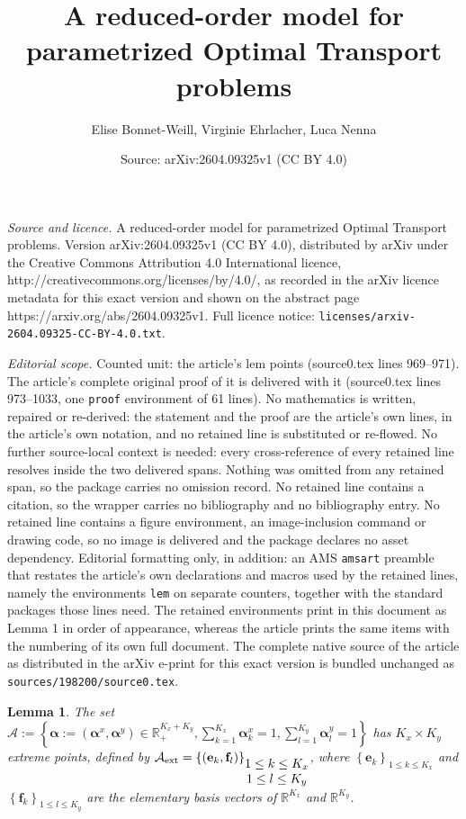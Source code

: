 \documentclass[10pt,a4paper]{amsart}
\title{A reduced-order model for parametrized Optimal Transport problems}
\author{Elise Bonnet-Weill, Virginie Ehrlacher, Luca Nenna}
\date{Source: arXiv:2604.09325v1 (CC BY 4.0)}
\newtheorem{lem}{Lemma}
\def\RR{\mathbb{R}}
\def\aalpha{\boldsymbol{\alpha}}
\def\cA{\mathcal{A}}
\def\ee{\mathbf{e}}
\def\ff{\mathbf{f}}
\begin{document}
\maketitle

\noindent\emph{Source and licence.} A reduced-order model for parametrized Optimal Transport problems. Version arXiv:2604.09325v1 (CC BY 4.0), distributed by arXiv under the Creative Commons Attribution 4.0 International licence, http://creativecommons.org/licenses/by/4.0/, as recorded in the arXiv licence metadata for this exact version and shown on the abstract page https://arxiv.org/abs/2604.09325v1. Full licence notice: \texttt{licenses/arxiv-2604.09325-CC-BY-4.0.txt}.\par\smallskip

\noindent\textit{Editorial scope.} Counted unit: the article's lem points (source0.tex lines 969--971). The article's complete original proof of it is delivered with it (source0.tex lines 973--1033, one \texttt{proof} environment of 61 lines). No mathematics is written, repaired or re-derived: the statement and the proof are the article's own lines, in the article's own notation, and no retained line is substituted or re-flowed.  No further source-local context is needed: every cross-reference of every retained line resolves inside the two delivered spans.  Nothing was omitted from any retained span, so the package carries no omission record.  No retained line contains a citation, so the wrapper carries no bibliography and no bibliography entry.  No retained line contains a figure environment, an image-inclusion command or drawing code, so no image is delivered and the package declares no asset dependency.  Editorial formatting only, in addition: an AMS \texttt{amsart} preamble that restates the article's own declarations and macros used by the retained lines, namely the environments \texttt{lem} on separate counters, together with the standard packages those lines need.  The retained environments print in this document as Lemma 1 in order of appearance, whereas the article prints the same items with the numbering of its own full document.  The complete native source of the article as distributed in the arXiv e-print for this exact version is bundled unchanged as \texttt{sources/198200/source0.tex}.
\begin{lem}\label{lemma: extreme points}
    The set $\displaystyle  \cA := \left\lbrace \aalpha := ({\aalpha^x, \aalpha^y})\in \mathbb{R}_+^{K_x + K_y}, \sum_{k=1}^{K_x} \mathbf{\aalpha}^x_k = 1, \sum_{l=1}^{K_y} \mathbf{\aalpha}^y_l = 1 \right\rbrace$  has  $K_x\times K_y$ extreme points, defined by $\cA_{\text{ext}} = \left\lbrace (\ee_{k}, \ff_{l})\right\rbrace_{\footnotesize \begin{matrix} 1 \leq k \leq K_x \\ 1\leq l \leq K_y \end{matrix}}$, where $\left\lbrace \ee_k \right\rbrace_{1 \leq k \leq K_x}$ and $\left\lbrace \ff_k \right\rbrace_{1 \leq l \leq K_y}$ are the elementary basis vectors of $\RR^{K_x}$ and $\RR^{K_y}$.
\end{lem}
\end{document}
